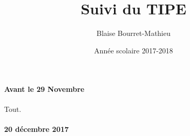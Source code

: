 \documentclass{article}
\title{Suivi du TIPE}
\author{Blaise Bourret-Mathieu}
\date{Année scolaire 2017-2018}
\begin{document}
\paragraph*{Avant le 29 Novembre}
Tout.

\paragraph*{20 décembre 2017}
\end{document}
